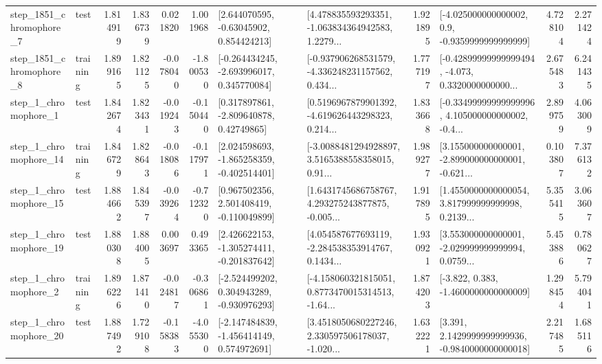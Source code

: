 \begin{tabular}{llrrrrllrlrr}
  step\_1851\_chromophore\_7 &      test &      1.814919 &    1.836739 &      0.021820 &  1.001968 &     [2.644070595, -0.63045902, 0.854424213] &  [4.478835593293351, -1.063834364942583, 1.2279... &       1.921895 &     [-4.025000000000002, 0.9, -0.9359999999999999] &            4.728104 &          2.271424 \\
  step\_1851\_chromophore\_8 &  training &      1.899165 &    1.821125 &     -0.078040 & -1.800530 &   [-0.264434245, -2.693996017, 0.345770084] &  [-0.937906268531579, -4.336248231157562, 0.434... &       1.777197 &  [-0.42899999999999494, -4.073, 0.3320000000000... &            2.675483 &          6.241435 \\
     step\_1\_chromophore\_1 &      test &      1.842674 &    1.823431 &     -0.019243 & -0.150440 &     [0.317897861, -2.809640878, 0.42749865] &  [0.5196967879901392, -4.619626443298323, 0.214... &       1.833668 &  [-0.33499999999999996, 4.105000000000002, -0.4... &            2.899759 &          4.063009 \\
    step\_1\_chromophore\_14 &  training &      1.846729 &    1.828643 &     -0.018086 & -0.117971 &   [2.024598693, -1.865258359, -0.402514401] &  [-3.0088481294928897, 3.5165388558358015, 0.91... &       1.989277 &  [3.155000000000001, -2.899000000000001, -0.621... &            0.103807 &          7.376132 \\
    step\_1\_chromophore\_15 &      test &      1.884662 &    1.845397 &     -0.039264 & -0.712320 &    [0.967502356, 2.501408419, -0.110049899] &  [1.6431745686758767, 4.293275243877875, -0.005... &       1.917895 &  [1.4550000000000054, 3.817999999999998, 0.2139... &            5.355415 &          3.063607 \\
    step\_1\_chromophore\_19 &      test &      1.880308 &    1.884005 &      0.003697 &  0.493365 &   [2.426622153, -1.305274411, -0.201837642] &  [4.054587677693119, -2.284538353914767, 0.1434... &       1.930921 &  [3.553000000000001, -2.029999999999994, 0.0759... &            5.453886 &          0.780627 \\
     step\_1\_chromophore\_2 &  training &      1.896226 &    1.871410 &     -0.024817 & -0.306861 &   [-2.524499202, 0.304943289, -0.930976293] &  [-4.158060321815051, 0.8773470015314513, -1.64... &       1.874203 &               [-3.822, 0.383, -1.4600000000000009] &            1.298454 &          5.794041 \\
    step\_1\_chromophore\_20 &      test &      1.887492 &    1.729108 &     -0.158383 & -4.055300 &   [-2.147484839, -1.456414149, 0.574972691] &  [3.4518050680227246, 2.330597506178037, -1.020... &       1.632221 &   [3.391, 2.1429999999999936, -0.9840000000000018] &            2.217485 &          1.685116 \\

\end{tabular}
